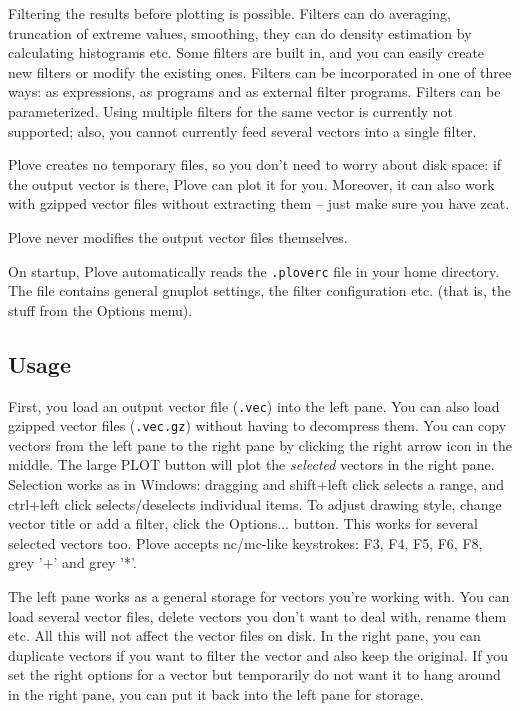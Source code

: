 Filtering the results before plotting is
possible. Filters can do averaging, truncation of extreme values,
smoothing, they can do density estimation by
calculating histograms etc. Some filters are built
in, and you can easily create new filters or modify the existing ones.
Filters can be incorporated in one of three ways: as  expressions,
as  programs and as external filter programs. Filters can be
parameterized. Using multiple filters for the same vector is currently not
supported; also, you cannot currently feed several vectors into a
single filter.

Plove creates no temporary files, so you don't need to worry
about disk space: if the output vector is there, Plove can plot
it for you. Moreover, it can also work with gzipped vector files
without extracting them -- just make sure you have zcat.


Plove never modifies the output vector files themselves.

On startup, Plove automatically reads the \texttt{.ploverc} file in
your home directory. The file contains general gnuplot settings, the
filter configuration etc. (that is, the stuff from the Options menu).




\subsection{Usage}

First, you load an output vector file (\texttt{.vec}) into the left
pane.  You can also load gzipped vector files (\texttt{.vec.gz})
without having to decompress them. You can copy vectors from the left
pane to the right pane by clicking the right arrow icon in the middle.
The large PLOT button will plot the \textit{selected} vectors in the
right pane. Selection works as in Windows: dragging and shift+left
click selects a range, and ctrl+left click selects/deselects
individual items. To adjust drawing style, change vector title or add
a filter, click the Options... button. This works for several selected
vectors too. Plove accepts nc/mc-like keystrokes: F3, F4, F5, F6, F8,
grey '+' and grey '*'.


The left pane works as a general storage for vectors you're working
with. You can load several vector files, delete vectors you don't
want to deal with, rename them etc. All this will not affect
the vector files on disk. In the right pane, you can duplicate
vectors if you want to filter the vector and also keep the original.
If you set the right options for a vector but temporarily do
not want it to hang around in the right pane, you can put it
back into the left pane for storage.





